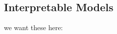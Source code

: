 \subsection{Interpretable Models} \label{sec:interp_models}
we want these here: \citet{Chipman2005-om, Morrison2016-fz, Van_Belle2012-dt, Park2016-ld, Jovanovic2016-gw, Choi2016-by, Huysmans2011-th, Caruana2015-za, Faghmous2014-og, Ruping2006-xj, Lipton2016-ug}
